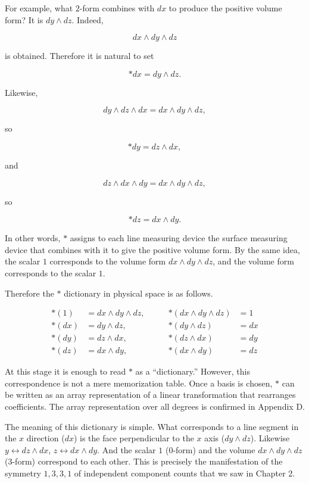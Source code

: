 For example, what \(2\)-form combines with \(dx\) to produce the
positive volume form? It is \(dy \wedge dz\). Indeed,

\[
dx \wedge dy \wedge dz
\]

is obtained. Therefore it is natural to set

\[
\ast dx = dy \wedge dz.
\]

Likewise,

\[
dy \wedge dz \wedge dx = dx \wedge dy \wedge dz,
\]

so

\[
\ast dy = dz \wedge dx,
\]

and

\[
dz \wedge dx \wedge dy = dx \wedge dy \wedge dz,
\]

so

\[
\ast dz = dx \wedge dy.
\]

In other words, \(\ast\) assigns to each line measuring device the
surface measuring device that combines with it to give the positive
volume form. By the same idea, the scalar \(1\) corresponds to the
volume form \(dx \wedge dy \wedge dz\), and the volume form corresponds
to the scalar \(1\).

Therefore the \(\ast\) dictionary in physical space is as follows.

\[\begin{aligned}
\ast(1) &= dx \wedge dy \wedge dz, \qquad &\ast(dx \wedge dy \wedge dz) &= 1 \\
\ast(dx) &= dy \wedge dz, \qquad &\ast(dy \wedge dz) &= dx \\
\ast(dy) &= dz \wedge dx, \qquad &\ast(dz \wedge dx) &= dy \\
\ast(dz) &= dx \wedge dy, \qquad &\ast(dx \wedge dy) &= dz
\end{aligned}\]

At this stage it is enough to read \(\ast\) as a ``dictionary.''
However, this correspondence is not a mere memorization table. Once a
basis is chosen, \(\ast\) can be written as an array representation of a
linear transformation that rearranges coefficients. The array
representation over all degrees is confirmed in Appendix D.

The meaning of this dictionary is simple. What corresponds to a line
segment in the \(x\) direction (\(dx\)) is the face perpendicular to the
\(x\) axis (\(dy \wedge dz\)). Likewise
\(y \leftrightarrow dz \wedge dx\), \(z \leftrightarrow dx \wedge dy\).
And the scalar \(1\) (\(0\)-form) and the volume
\(dx \wedge dy \wedge dz\) (\(3\)-form) correspond to each other. This
is precisely the manifestation of the symmetry \(1, 3, 3, 1\) of
independent component counts that we saw in Chapter 2.

